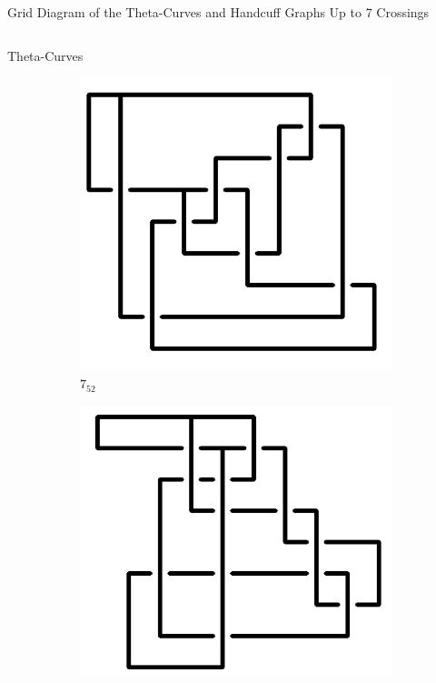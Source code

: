\documentclass[final]{beamer}
\begin{document}
\begin{frame}[t]
\begin{alertblock}{Grid Diagram of the Theta-Curves and Handcuff Graphs Up to 7 Crossings}
\begin{columns}[t]
\begin{column}{0.5\textwidth}
\begin{alertblock}{Theta-Curves}
\begin{figure}
    \begin{subfigure}{0.075\textwidth}
    \includegraphics[width=\columnwidth]{../Midterm_Poster/grid_diagram/theta_7_52.png}
    \caption{$7_{52}$} 
    \end{subfigure}
    \begin{subfigure}{0.075\textwidth}
    \includegraphics[width=\columnwidth]{../Midterm_Poster/grid_diagram/theta_7_53.png}

\end{subfigure}
\end{figure}
\end{alertblock}
\end{column}
\end{columns}
\end{alertblock}
\end{frame}
\end{document}
